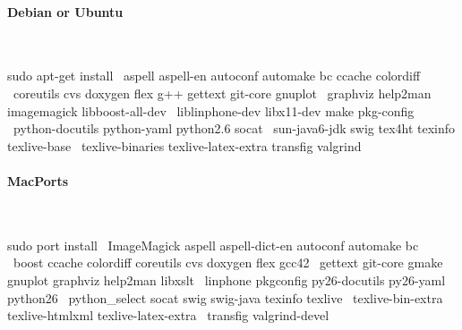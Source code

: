 \paragraph{Debian or Ubuntu}~\\
\begin{shell}
sudo apt-get install  \
   aspell aspell-en autoconf automake bc ccache colordiff  \
   coreutils cvs doxygen flex g++ gettext git-core gnuplot  \
   graphviz help2man imagemagick libboost-all-dev  \
   liblinphone-dev libx11-dev make pkg-config  \
   python-docutils python-yaml python2.6 socat  \
   sun-java6-jdk swig tex4ht texinfo texlive-base  \
   texlive-binaries texlive-latex-extra transfig valgrind

\end{shell}

\paragraph{MacPorts}~\\
\begin{shell}
sudo port install  \
   ImageMagick aspell aspell-dict-en autoconf automake bc  \
   boost ccache colordiff coreutils cvs doxygen flex gcc42  \
   gettext git-core gmake gnuplot graphviz help2man libxslt  \
   linphone pkgconfig py26-docutils py26-yaml python26  \
   python_select socat swig swig-java texinfo texlive  \
   texlive-bin-extra texlive-htmlxml texlive-latex-extra  \
   transfig valgrind-devel

\end{shell}
